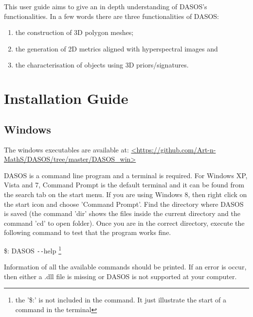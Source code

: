 \documentclass{article}
\begin{document}
	\par This user guide aims to give an in depth understanding of DASOS's functionalities. In a few words there are three functionalities of DASOS: 
	\begin{enumerate}
		\item the construction of 3D polygon meshes; 
		\item the generation of 2D metrics aligned with hyperspectral images and
		\item the characterisation of objects using 3D priors/signatures. 
	\end{enumerate}
	

	
	\section{Installation Guide} \label{Installation}
		\subsection {Windows}
		\par The windows executables are available at: \newline \url{<https://github.com/Art-n-MathS/DASOS/tree/master/DASOS_win>}
		 
		\par DASOS is a command line program and a terminal is required. For Windows XP, Vista and 7,  Command Prompt is the default terminal and it can be found from the search tab on the start menu. If you are using Windows 8, then right click on the start icon and choose 'Command Prompt'. Find the directory where DASOS is saved (the command 'dir' shows the files inside the current directory and the command 'cd' to open folder). Once you are in the correct directory, execute the following command to test that the program works fine. 
		
		\par \$: DASOS \texttt{-{}-}help  \footnote{the '\$:' is not included in the command. It just illustrate the start of a command in the terminal} 
		\par Information of all the available commands should be printed. If an error is occur, then either a .dll file is missing or DASOS is not supported at your computer.
		
		
\end{document}
